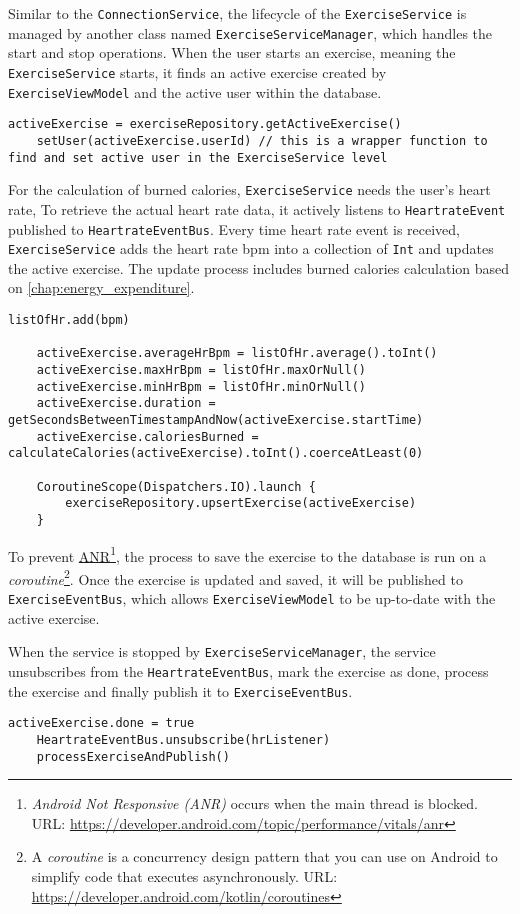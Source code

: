 Similar to the \verb;ConnectionService;, the lifecycle of the \verb;ExerciseService; is managed by another class named \verb;ExerciseServiceManager;, which handles the start and stop operations. 
When the user starts an exercise, meaning the \texttt{ExerciseService} starts, it finds an active exercise created by \texttt{ExerciseViewModel} and the active user within the database. 
\begin{lstlisting}[caption={On ExerciseService started (Kotlin - ExerciseService)}]
    activeExercise = exerciseRepository.getActiveExercise()
    setUser(activeExercise.userId) // this is a wrapper function to find and set active user in the ExerciseService level
\end{lstlisting}

For the calculation of burned calories, \verb;ExerciseService; needs the user's heart rate, To retrieve the actual heart rate data, it actively listens to \verb;HeartrateEvent; published to \verb;HeartrateEventBus;.
Every time heart rate event is received, \verb;ExerciseService; adds the heart rate bpm into a collection of \verb;Int; and updates the active exercise. The update process includes burned calories calculation based on \autoref{chap:energy_expenditure}. 
\begin{lstlisting}[caption={Process active exercise snippet (Kotlin - ExerciseService)}]
    listOfHr.add(bpm)

    activeExercise.averageHrBpm = listOfHr.average().toInt()
    activeExercise.maxHrBpm = listOfHr.maxOrNull()
    activeExercise.minHrBpm = listOfHr.minOrNull()
    activeExercise.duration = getSecondsBetweenTimestampAndNow(activeExercise.startTime)
    activeExercise.caloriesBurned = calculateCalories(activeExercise).toInt().coerceAtLeast(0)

    CoroutineScope(Dispatchers.IO).launch {
        exerciseRepository.upsertExercise(activeExercise)
    }
\end{lstlisting}

To prevent \url{ANR}\footnote{\emph{Android Not Responsive (ANR)} occurs when the main thread is blocked. URL: \url{https://developer.android.com/topic/performance/vitals/anr}}, the process to save the exercise to the database is run on a \emph{coroutine}\footnote{A \emph{coroutine} is a concurrency design pattern that you can use on Android to simplify code that executes asynchronously. URL: \url{https://developer.android.com/kotlin/coroutines}}.
Once the exercise is updated and saved, it will be published to \verb;ExerciseEventBus;, which allows \verb;ExerciseViewModel; to be up-to-date with the active exercise.

When the service is stopped by \verb;ExerciseServiceManager;, the service unsubscribes from the \verb;HeartrateEventBus;, mark the exercise as done, process the exercise and finally publish it to \verb;ExerciseEventBus;.
\begin{lstlisting}[caption={On exercise stopped snippet (Kotlin - ExerciseService)}]
    activeExercise.done = true
    HeartrateEventBus.unsubscribe(hrListener)
    processExerciseAndPublish()
\end{lstlisting}